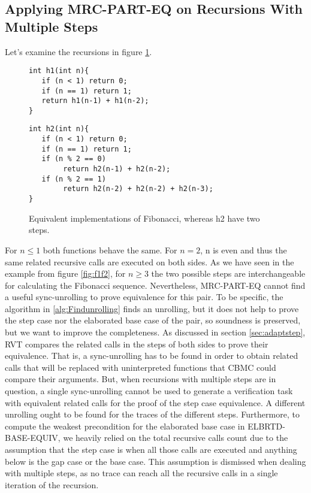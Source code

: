 \subsection{Applying MRC-PART-EQ on Recursions With Multiple Steps}
Let's examine the recursions in figure \ref{fig:f1f2cond}.
\begin{figure}[h]
\begin{center}
\begin{minipage}{7 cm}
\begin{lstlisting}
int h1(int n){
   if (n < 1) return 0;
   if (n == 1) return 1; 
   return h1(n-1) + h1(n-2);
}
\end{lstlisting}
\end{minipage}
\begin{minipage}{7 cm}
\begin{lstlisting}
int h2(int n){
   if (n < 1) return 0;
   if (n == 1) return 1; 
   if (n % 2 == 0)
        return h2(n-1) + h2(n-2);
   if (n % 2 == 1)
        return h2(n-2) + h2(n-2) + h2(n-3);
}
\end{lstlisting}
\end{minipage}
\caption{Equivalent implementations of Fibonacci, whereas h2 have two steps.}
\label{fig:f1f2cond}
\end{center}
\end{figure}
For $n\leq1$ both functions behave the same. For $n=2$, n is even and thus the same related recursive calls are executed on both sides. As we have seen in the example from figure \ref{fig:f1f2}, for $n\geq3$ the two possible steps are interchangeable for calculating the Fibonacci sequence. Nevertheless, MRC-PART-EQ cannot find a useful sync-unrolling to prove equivalence for this pair. To be specific, the algorithm in \ref{alg:Findunrolling} finds an unrolling, but it does not help to prove the step case nor the elaborated base case of the pair, so soundness is preserved, but we want to improve the completeness. As discussed in section \ref{sec:adaptstep}, RVT compares the related calls in the steps of both sides to prove their equivalence. That is, a sync-unrolling has to be found in order to obtain related calls that will be replaced with uninterpreted functions that CBMC could compare their arguments. But, when recursions with multiple steps are in question, a single sync-unrolling cannot be used to generate a verification task with equivalent related calls for the proof of the step case equivalence. A different unrolling ought to be found for the traces of the different steps. Furthermore, to compute the weakest precondition for the elaborated base case in ELBRTD-BASE-EQUIV, we heavily relied on the total recursive calls count due to the assumption that the step case is when all those calls are executed and anything below is the gap case or the base case. This assumption is dismissed when dealing with multiple steps, as no trace can reach all the recursive calls in a single iteration of the recursion.

